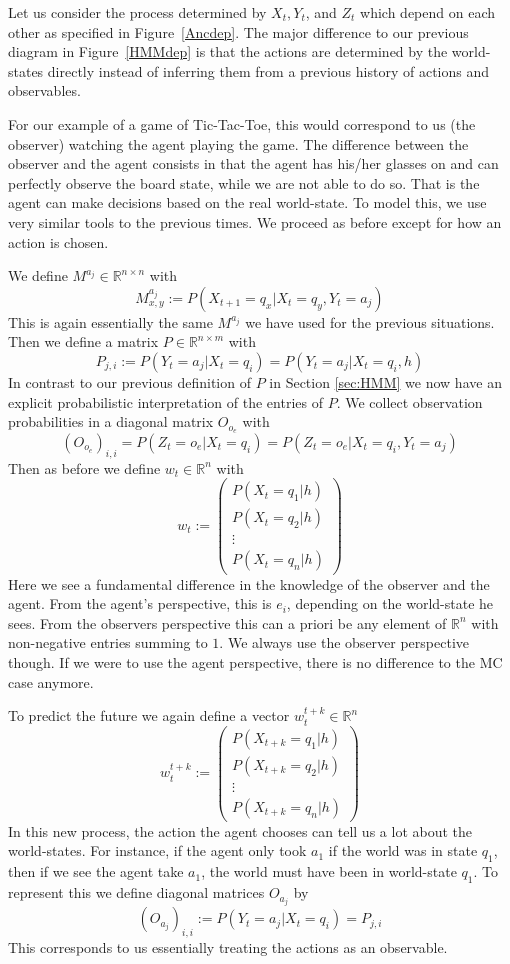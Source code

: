 \documentclass{article}
\theoremstyle{definition}
\begin{document}
Let us consider the process determined by $X_t,Y_t$, and $Z_t$ which depend on each other as specified in Figure~\ref{Ancdep}. 
The major difference to our previous diagram in Figure~\ref{HMMdep} is that the actions are determined by the world-states directly instead of inferring them from a previous history of actions and observables. 

For our example of a game of Tic-Tac-Toe, this would correspond to us (the observer) watching the agent playing the game. The difference between the observer and the agent consists in that the agent has his/her glasses on and can perfectly observe the board state, while we are not able to do so. That is the agent can make decisions based on the real world-state. 
To model this, we use very similar tools to the previous times. We proceed as before except for how an action is chosen. 

We define $M^{a_j} \in \mathbb{R}^{n\times n}$ with 
\[
M^{a_j}_{x,y}:=P(X_{t+1}=q_x|X_t=q_y,Y_t=a_j)
\]
This is again essentially the same $M^{a_j}$ we have used for the previous situations.
Then we define a matrix $P\in \mathbb{R}^{n\times m}$ with 
\[
P_{j,i}:=P(Y_t=a_j|X_t=q_i)=P(Y_t=a_j|X_t=q_i,h)
\]
In contrast to our previous definition of $P$ in Section \ref{sec:HMM} we now have an explicit probabilistic interpretation of the entries of $P$. 
We collect observation probabilities in a diagonal matrix $O_{o_e}$ with 
\[
(O_{o_e})_{i,i}=P(Z_t=o_e|X_t=q_i)=P(Z_t=o_e|X_t=q_i,Y_t=a_j)
\]
Then as before we define $w_t \in \mathbb{R}^{n}$ with 
\[
w_t:=
\left ( 
\begin{matrix}
P(X_t=q_1|h) \\
P(X_t=q_2|h) \\
\vdots \\
P(X_t=q_n|h)
\end{matrix}
\right )
\]
Here we see a fundamental difference in the knowledge of the observer and the agent. From the agent's perspective, this is $e_i$, depending on the world-state he sees. From the observers perspective this can a priori be any element of $\mathbb{R}^{n} $ with non-negative entries summing to $1$. We always use the observer perspective though. If we were to use the agent perspective, there is no difference to the MC case anymore.

To predict the future we again define a vector $w_t^{t+k} \in \mathbb{R}^{n}$ 
\[
w_t^{t+k}:=
\left ( 
\begin{matrix}
P(X_{t+k}=q_1|h) \\
P(X_{t+k}=q_2|h) \\
\vdots \\
P(X_{t+k}=q_n|h)
\end{matrix}
\right )
\]
In this new process, the action the agent chooses can tell us a lot about the world-states. For instance, if the agent only took $a_1$ if the world was in state $q_1$, then if we see the agent take $a_1$, the world must have been in world-state $q_1$.  
To represent this we define diagonal matrices $O_{a_j}$ by
\[
(O_{a_j})_{i,i}:=P(Y_t=a_j|X_t=q_i)=P_{j,i}
\]
This corresponds to us essentially treating the actions as an observable. 
\end{document}
